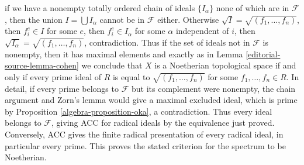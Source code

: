 \begin{example}
if we have a nonempty totally ordered chain of ideals
$\{I_\alpha\}$ none of which are in $\mathcal{F}$, then the union
$I = \bigcup I_\alpha$ cannot be in $\mathcal{F}$ either. Otherwise
$\sqrt{I} = \sqrt{(f_1, \ldots, f_n)}$, then $f_i^e \in I$ for some $e$,
then $f_i^e \in I_\alpha$ for some $\alpha$ independent of $i$, then
$\sqrt{I_\alpha} = \sqrt{(f_1, \ldots, f_n)}$, contradiction.
Thus if the set of ideals not in $\mathcal{F}$ is nonempty, then it
has maximal elements and
exactly as in Lemma \ref{editorial-source-lemma-cohen} we conclude that $X$ is a
Noetherian topological space if and only if every prime ideal of $R$
is equal to $\sqrt{(f_1, \ldots, f_n)}$ for some $f_1, \ldots, f_n \in R$.
In detail, if every prime belongs to $\mathcal F$ but its complement
were nonempty, the chain argument and Zorn's lemma would give a maximal
excluded ideal, which is prime by Proposition \ref{algebra-proposition-oka},
a contradiction. Thus every ideal belongs to $\mathcal F$, giving
ACC for radical ideals by the equivalence just proved.
Conversely, ACC gives the finite radical presentation of every radical
ideal, in particular every prime. This proves the stated criterion
for the spectrum to be Noetherian.
\end{example}
